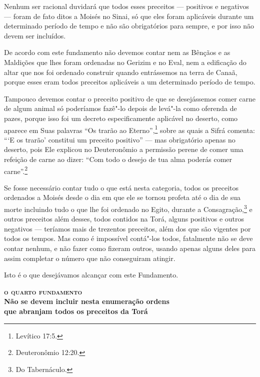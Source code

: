 Nenhum ser racional duvidará que todos esses preceitos --- positivos e
negativos --- foram de fato ditos a Moisés no Sinai, só que eles foram
aplicáveis durante um determinado período de tempo e não são
obrigatórios para sempre, e por isso não devem ser incluídos.

De acordo com este fundamento não devemos contar nem as Bênçãos e as Maldições que lhes foram ordenadas no Gerizim e no Eval\starr, nem a
edificação do altar que nos foi ordenado construir quando entrássemos
na terra de Canaã, porque esses eram todos preceitos aplicáveis a um
determinado período de tempo.

Tampouco devemos contar o preceito positivo de que se desejássemos
comer carne de algum animal só poderíamos fazê"-lo depois de levá"-la
como oferenda de pazes, porque isso foi um decreto especificamente
aplicável no deserto, como aparece em Suas palavras ``Os trarão ao
Eterno'',\footnote{Levítico 17:5.} sobre as quais a Sifrá\starr{} comenta: ```E os
trarão' constitui um preceito positivo'' --- mas obrigatório apenas no
deserto, pois Ele explicou no Deuteronômio a permissão perene de comer
uma refeição de carne ao dizer: ``Com todo o desejo de tua alma poderás
comer carne''.\footnote{Deuteronômio 12:20.}

Se fosse necessário contar tudo o que está nesta categoria, todos os
preceitos ordenados a Moisés desde o dia em que ele se tornou profeta
até o dia de sua morte incluindo tudo o que lhe foi ordenado no Egito,
durante a Consagração,\footnote{Do Tabernáculo.} e outros preceitos além
desses, todos contidos na Torá\starr, alguns positivos e outros negativos
--- teríamos mais de trezentos preceitos, além dos que são vigentes por
todos os tempos. Mas como é impossível contá"-los todos, fatalmente não
se deve contar nenhum, e não fazer como fizeram outros, usando apenas
alguns deles para assim completar o número que não conseguiram atingir.

Isto é o que desejávamos alcançar com este Fundamento.


\pagebreak

\noindent\textbf{\textsc{o quarto fundamento}\\Não se devem incluir nesta enumeração ordens\\ que abranjam todos os preceitos da Torá\starr}

